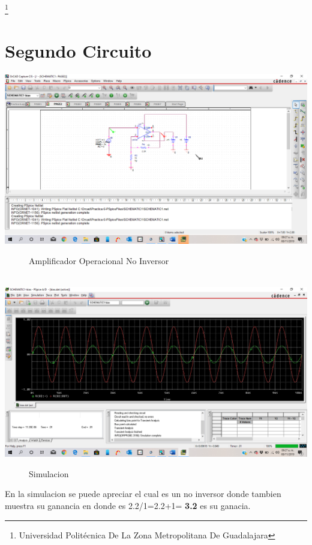 \documentclass[10pt,a4paper]{article}
\begin{document}
\footnote{Universidad Politécnica De La Zona Metropolitana De Guadalajara} 

\newpage

\section{Segundo Circuito}
\begin{center}
 \includegraphics[scale=0.3]{3.png}
 \begin{figure}[hbtp]
 \caption{Amplificador Operacional No Inversor}
 \centering
 \end{figure}\\
  \includegraphics[scale=0.3]{4.png}
 \begin{figure}[hbtp]
 \caption{Simulacion}
 \centering
 \end{figure} 
\end{center}

En la simulacion se puede apreciar el cual es un no inversor donde tambien muestra su ganancia en donde es 2.2/1=2.2+1= \textbf{3.2} es su ganacia.
\end{document}
